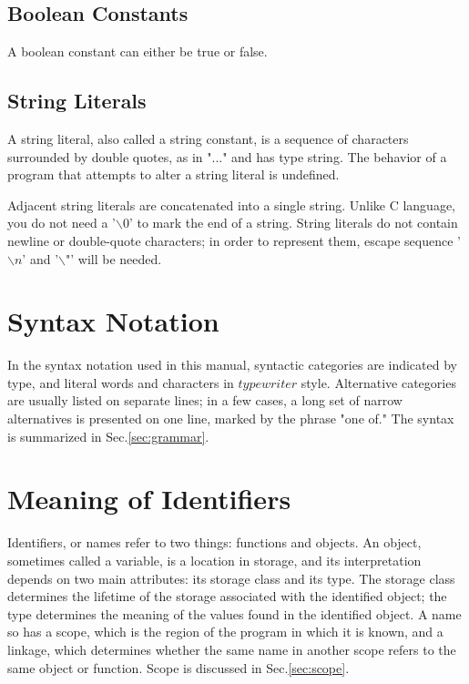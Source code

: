 \documentclass[letterpaper,12pt]{article}
\begin{document}
\subsection{Boolean Constants}
A boolean constant can either be true or false.

\subsection{String Literals}
A string literal, also called a string constant, is a sequence of characters surrounded by double quotes, as in "..." and has type string. The behavior of a program that attempts to alter a string literal is undefined. \newline

Adjacent string literals are concatenated into a single string. Unlike C language, you do not need a '$\backslash 0$' to mark the end of a string. String literals do not contain newline or double-quote characters; in order to represent them, escape sequence '$\backslash n$' and '$\backslash$"' will be needed.\newline

\section{Syntax Notation}
In the syntax notation used in this manual, syntactic categories are indicated by {} type, and literal words and characters in $typewriter$ style. Alternative categories are usually listed on separate lines; in a few cases, a long set of narrow alternatives is presented on one line, marked by the phrase "one of." The syntax is summarized in Sec.\ref{sec:grammar}.

\section{Meaning of Identifiers}
Identifiers, or names refer to two things: functions and objects. An object, sometimes called a variable, is a location in storage, and its interpretation depends on two main attributes: its storage class and its type. The storage class determines the lifetime of the storage associated with the identified object; the type determines the meaning of the values found in the identified object. A name so has a scope, which is the region of the program in which it is known, and a linkage, which determines whether the same name in another scope refers to the same object or function. Scope is discussed in Sec.\ref{sec:scope}.
\end{document}
